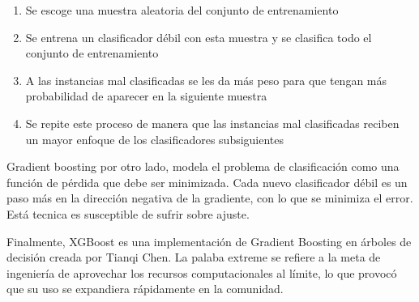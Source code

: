 \begin{enumerate}
    \item Se escoge una muestra aleatoria del conjunto de entrenamiento
    \item Se entrena un clasificador débil con esta muestra y se clasifica todo el conjunto de entrenamiento
    \item A las instancias mal clasificadas se les da más peso para que tengan más probabilidad de aparecer en la siguiente muestra
    \item Se repite este proceso de manera que las instancias mal clasificadas reciben un mayor enfoque de los clasificadores subsiguientes
\end{enumerate}

Gradient boosting por otro lado, modela el problema de clasificación como una función de pérdida que debe ser minimizada. Cada nuevo clasificador débil es un paso más en la dirección negativa de la gradiente, con lo que se minimiza el error. Está tecnica es susceptible de sufrir sobre ajuste.

Finalmente, XGBoost es una implementación de Gradient Boosting en árboles de decisión creada por Tianqi Chen. La palaba extreme se refiere a la meta de ingeniería de aprovechar los recursos computacionales al límite, lo que provocó que su uso se expandiera rápidamente en la comunidad.



